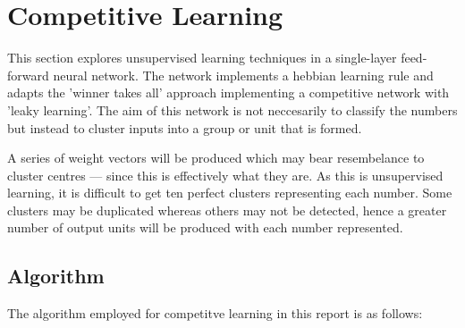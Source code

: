 \documentclass[11pt,journal,transmag,final]{IEEEtran}
\begin{document}
\section{Competitive Learning}

This section explores unsupervised learning techniques in a single-layer feed-forward neural network. The network implements a hebbian learning rule and adapts the 'winner takes all' approach implementing a competitive network with 'leaky learning'. The aim of this network is not neccesarily to classify the numbers but instead to cluster inputs into a group or unit that is formed.

A series of weight vectors will be produced which may bear resembelance to cluster centres --- since this is effectively what they are. As this is unsupervised learning, it is difficult to get ten perfect clusters representing each number. Some clusters may be duplicated whereas others may not be detected, hence a greater number of output units will be produced with each number represented.

\subsection{Algorithm}

The algorithm employed for competitve learning in this report is as follows:
\end{document}

